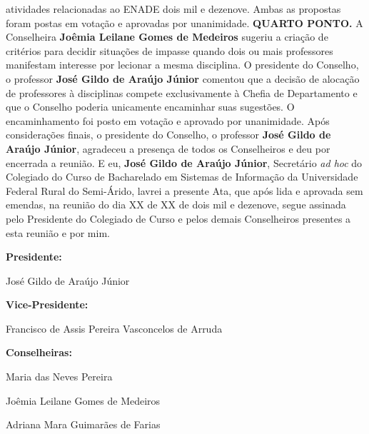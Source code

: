 \documentclass[a4paper, 10pt]{report}
\begin{document}
{atividades relacionadas ao ENADE dois mil e dezenove. Ambas as propostas foram postas em votação e aprovadas por unanimidade. \textbf{QUARTO PONTO.} A Conselheira \textbf{Joêmia Leilane Gomes de Medeiros} sugeriu a criação de critérios para decidir situações de impasse quando dois ou mais professores manifestam interesse por lecionar a mesma disciplina. O presidente do Conselho, o professor \textbf{José Gildo de Araújo Júnior} comentou que a decisão de alocação de professores à disciplinas compete exclusivamente à Chefia de Departamento e que o Conselho poderia unicamente encaminhar suas sugestões. O encaminhamento foi posto em votação e aprovado por unanimidade. Após considerações finais, o presidente do Conselho, o professor \textbf{José Gildo de Araújo Júnior}, agradeceu a presença de todos os Conselheiros e deu por encerrada a reunião. E eu, \textbf{José Gildo de Araújo Júnior}, Secretário \textit{ad hoc} do Colegiado do Curso de Bacharelado em Sistemas de Informação da Universidade Federal Rural do Semi-Árido, lavrei a presente Ata, que após lida e aprovada sem emendas, na reunião do dia XX de XX de dois mil e dezenove, segue assinada pelo Presidente do Colegiado de Curso e pelos demais Conselheiros presentes a esta reunião e por mim.

\textbf{Presidente:}

José Gildo de Araújo Júnior

\textbf{Vice-Presidente:}

Francisco de Assis Pereira Vasconcelos de Arruda

\textbf{Conselheiras:}

Maria das Neves Pereira

Joêmia Leilane Gomes de Medeiros

Adriana Mara Guimarães de Farias

}
\end{document}
